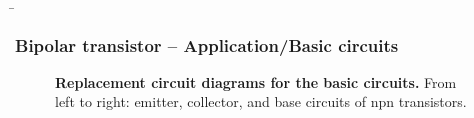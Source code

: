 \begin{frame}
    \b{ \frametitle{Bipolar transistor -- Application/Basic circuits}
        \begin{figure}[H]
            \label{fig:ErsatzschaltbilderEmitter-Kollektor-UndBasisschaltungFolien}
            \caption{\textbf{Replacement circuit diagrams for the basic circuits.} From left to right: emitter, collector, and base circuits of npn transistors.} 
        \end{figure}}
\end{frame}

